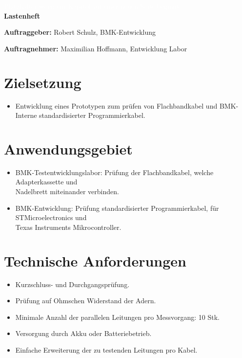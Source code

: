 \documentclass[a4paper,11pt]{scrartcl}
\begin{document}
\begin{center}
	\begin{huge}
	\textcolor{white}{\tiny{Platzhalter wenn ein Kapitel auf einer neuen Seite beginnt\\}}
	\textbf{Lastenheft}
	\end{huge}
\end{center}

\textbf{Auftraggeber:}
Robert Schulz, BMK-Entwicklung

\textbf{Auftragnehmer:}
Maximilian Hoffmann, Entwicklung Labor


\section{Zielsetzung}

\begin{itemize}
	\item{Entwicklung eines Prototypen zum prüfen von Flachbandkabel und BMK-Interne standardisierter Programmierkabel.}
\end{itemize}

\section{Anwendungsgebiet}

\begin{itemize}
	\item{BMK-Testentwicklungslabor: Prüfung der Flachbandkabel, welche Adapterkassette und \\ Nadelbrett miteinander verbinden.}
	
	\item{BMK-Entwicklung: Prüfung standardisierter Programmierkabel, für STMicroelectronics und \\ Texas Instruments Mikrocontroller.}
\end{itemize}

\section{Technische Anforderungen}

\begin{itemize}
	\item{Kurzschluss- und Durchgangsprüfung.}
	\item{Prüfung auf Ohmschen Widerstand der Adern.}
	\item{Minimale Anzahl der parallelen Leitungen pro Messvorgang: 10 Stk.}
	\item{Versorgung durch Akku oder Batteriebetrieb.}
	\item{Einfache Erweiterung der zu testenden Leitungen pro Kabel.}
\end{itemize}
\end{document}

